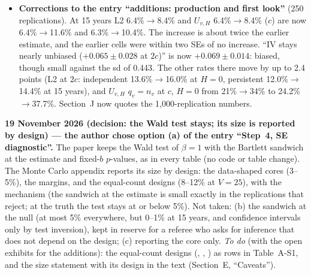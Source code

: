 \documentclass[11pt]{article}
\newcommand{\code}[1]{\texttt{\detokenize{#1}}}
\begin{document}
\begin{itemize}
\item \textbf{Corrections to the entry ``additions: production and first look''} (250 replications). At 15 years L2 6.4\%$\to$8.4\% and $U_{v,H}$ 6.4\%$\to$8.4\% ($c$) are now 6.4\%$\to$11.6\% and 6.3\%$\to$10.4\%. The increase is about twice the earlier estimate, and the earlier cells were within two SEs of no increase. ``IV stays nearly unbiased ($+0.065\pm0.028$ at $2c$)'' is now $+0.069\pm0.014$: biased, though small against the sd of 0.443. The other rates there move by up to 2.4 points (L2 at $2c$: independent 13.6\%$\to$16.0\% at $H=0$, persistent 12.0\%$\to$14.4\% at 15 years), and $U_{v,H}$ $q_v=n_v$ at $c$, $H=0$ from 21\%$\to$34\% to 24.2\%$\to$37.7\%. Section~J now quotes the 1{,}000-replication numbers.
\end{itemize}

\textbf{19 November 2026 (decision: the Wald test stays; its size is reported by design) --- the author chose option (a) of the entry ``Step~4, SE diagnostic''.} The paper keeps the Wald test of $\beta=1$ with the Bartlett sandwich at the estimate and fixed-$b$ $p$-values, as in every table (no code or table change). The Monte Carlo appendix reports its size by design: the data-shaped cores (3--5\%), the margins, and the equal-count designs (8--12\% at $V=25$), with the mechanism (the sandwich at the estimate is small exactly in the replications that reject; at the truth the test stays at or below 5\%). Not taken: (b) the sandwich at the null (at most 5\% everywhere, but 0--1\% at 15 years, and confidence intervals only by test inversion), kept in reserve for a referee who asks for inference that does not depend on the design; (c) reporting the core only. \emph{To do} (with the open exhibits for the additions): the equal-count designs (\code{h_V25_n5}, \code{h_V25_n20}, \code{w_V25_n15}) as rows in Table~A-S1, and the size statement with its design in the text (Section~E, ``Caveats'').
\end{document}
